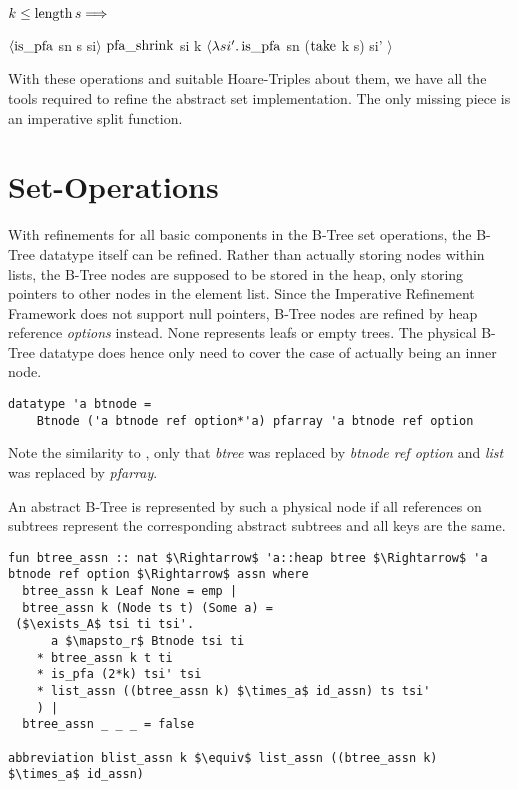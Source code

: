 \begin{lemma}
    $k \le \operatorname{length} s\Longrightarrow$ \\
    \begin{center}
    $\langle \operatorname{is\_pfa}$ sn s si$\rangle$
    $\operatorname{pfa\_shrink}$ si k
    $\langle\lambda si'. \operatorname{is\_pfa}$ sn ($\operatorname{take}$ k s) si' $\rangle$
    \end{center}
\end{lemma}

With these operations and suitable Hoare-Triples about them,
we have all the tools required to refine the abstract set implementation.
The only missing piece is an imperative split function.

\section{Set-Operations}

With refinements for all basic components in the B-Tree set operations,
the B-Tree datatype itself can be refined.
Rather than actually storing nodes within lists,
the B-Tree nodes are supposed to be stored in the heap,
only storing pointers to other nodes in the element list.
Since the Imperative Refinement Framework does not support null pointers,
B-Tree nodes are refined by heap reference \textit{options} instead.
None represents leafs or empty trees.
The physical B-Tree datatype does hence only need to cover the case
of actually being an inner node.

\begin{lstlisting}[mathescape=true, language=Isabelle]
datatype 'a btnode =
    Btnode ('a btnode ref option*'a) pfarray 'a btnode ref option
\end{lstlisting}

Note the similarity to ,
only that \textit{btree} was replaced by \textit{btnode ref option}
and \textit{list} was replaced by \textit{pfarray}.

An abstract B-Tree is represented by such a physical node
if all references on subtrees represent the corresponding
abstract subtrees and all keys are the same.

\begin{lstlisting}[mathescape=true, language=Isabelle]
fun btree_assn :: nat $\Rightarrow$ 'a::heap btree $\Rightarrow$ 'a btnode ref option $\Rightarrow$ assn where
  btree_assn k Leaf None = emp |
  btree_assn k (Node ts t) (Some a) = 
 ($\exists_A$ tsi ti tsi'.
      a $\mapsto_r$ Btnode tsi ti
    * btree_assn k t ti
    * is_pfa (2*k) tsi' tsi
    * list_assn ((btree_assn k) $\times_a$ id_assn) ts tsi'
    ) |
  btree_assn _ _ _ = false

abbreviation blist_assn k $\equiv$ list_assn ((btree_assn k) $\times_a$ id_assn)

\end{lstlisting}

